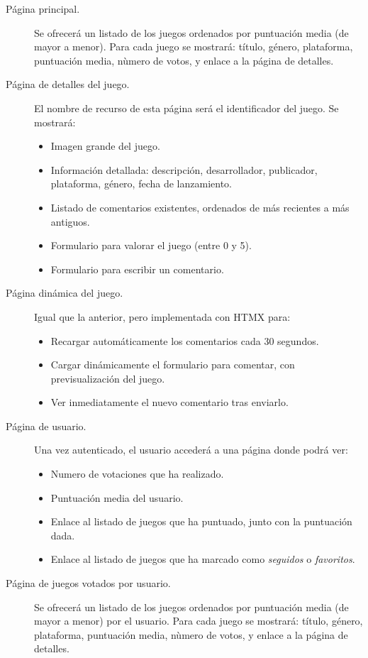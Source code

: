 \begin{description}
\item[Página principal.] Se ofrecerá un listado de los juegos ordenados por puntuación media (de mayor a menor). Para cada juego se mostrará: título, género, plataforma, puntuación media, nùmero de votos, y enlace a la página de detalles.

\item[Página de detalles del juego.] El nombre de recurso de esta página será el identificador del juego. Se mostrará:
\begin{itemize}
\item Imagen grande del juego.
\item Información detallada: descripción, desarrollador, publicador, plataforma, género, fecha de lanzamiento.
\item Listado de comentarios existentes, ordenados de más recientes a más antiguos.
\item Formulario para valorar el juego (entre 0 y 5).
\item Formulario para escribir un comentario.
\end{itemize}

\item[Página dinámica del juego.] Igual que la anterior, pero implementada con HTMX para:
\begin{itemize}
\item Recargar automáticamente los comentarios cada 30 segundos.
\item Cargar dinámicamente el formulario para comentar, con previsualización del juego.
\item Ver inmediatamente el nuevo comentario tras enviarlo.
\end{itemize}

\item[Página de usuario.] Una vez autenticado, el usuario accederá a una página donde podrá ver:
\begin{itemize}
\item Numero de votaciones que ha realizado.
\item Puntuación media del usuario.
\item Enlace al listado de juegos que ha puntuado, junto con la puntuación dada.
\item Enlace al listado de juegos que ha marcado como \textit{seguidos} o \textit{favoritos}.
\end{itemize}

\item[Página de juegos votados por usuario.] Se ofrecerá un listado de los juegos ordenados por puntuación media (de mayor a menor) por el usuario. Para cada juego se mostrará: título, género, plataforma, puntuación media, nùmero de votos, y enlace a la página de detalles.


\end{description}

